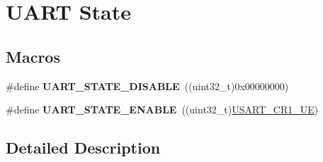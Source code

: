 \hypertarget{group___u_a_r_t___state}{}\section{U\+A\+RT State}
\label{group___u_a_r_t___state}
\subsection*{Macros}
\begin{DoxyCompactItemize}
\item 
\#define {\bfseries U\+A\+R\+T\+\_\+\+S\+T\+A\+T\+E\+\_\+\+D\+I\+S\+A\+B\+LE}~((uint32\+\_\+t)0x00000000)\hypertarget{group___u_a_r_t___state_gaf32492459be708981ebc5615194cdae9}{}\label{group___u_a_r_t___state_gaf32492459be708981ebc5615194cdae9}

\item 
\#define {\bfseries U\+A\+R\+T\+\_\+\+S\+T\+A\+T\+E\+\_\+\+E\+N\+A\+B\+LE}~((uint32\+\_\+t)\hyperlink{group___peripheral___registers___bits___definition_ga2bb650676aaae4a5203f372d497d5947}{U\+S\+A\+R\+T\+\_\+\+C\+R1\+\_\+\+UE})\hypertarget{group___u_a_r_t___state_gab6b470dccef2a518a45554b171acff5b}{}\label{group___u_a_r_t___state_gab6b470dccef2a518a45554b171acff5b}

\end{DoxyCompactItemize}


\subsection{Detailed Description}
